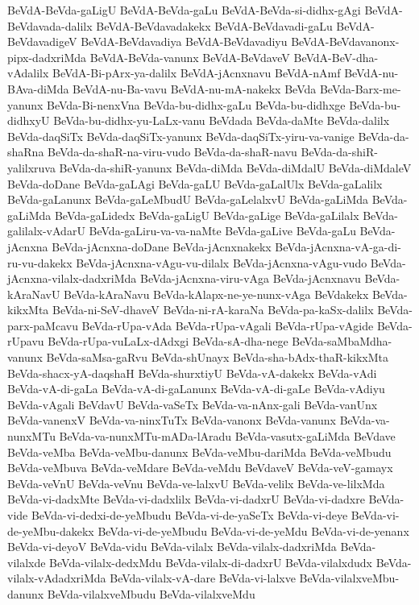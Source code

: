 {BeVdA-BeVda-gaLigU
BeVdA-BeVda-gaLu
BeVdA-BeVda-si-didhx-gAgi
BeVdA-BeVdavada-dalilx
BeVdA-BeVdavadakekx
BeVdA-BeVdavadi-gaLu
BeVdA-BeVdavadigeV
BeVdA-BeVdavadiya
BeVdA-BeVdavadiyu
BeVdA-BeVdavanonx-pipx-dadxriMda
BeVdA-BeVda-vanunx
BeVdA-BeVdaveV
BeVdA-BeV-dha-vAdalilx
BeVdA-Bi-pArx-ya-dalilx
BeVdA-jAcnxnavu
BeVdA-nAmf
BeVdA-nu-BAva-diMda
BeVdA-nu-Ba-vavu
BeVdA-nu-mA-nakekx
BeVda
BeVda-Barx-me-yanunx
BeVda-Bi-nenxVna
BeVda-bu-didhx-gaLu
BeVda-bu-didhxge
BeVda-bu-didhxyU
BeVda-bu-didhx-yu-LaLx-vanu
BeVdada
BeVda-daMte
BeVda-dalilx
BeVda-daqSiTx
BeVda-daqSiTx-yanunx
BeVda-daqSiTx-yiru-va-vanige
BeVda-da-shaRna
BeVda-da-shaR-na-viru-vudo
BeVda-da-shaR-navu
BeVda-da-shiR-yalilxruva
BeVda-da-shiR-yanunx
BeVda-diMda
BeVda-diMdalU
BeVda-diMdaleV
BeVda-doDane
BeVda-gaLAgi
BeVda-gaLU
BeVda-gaLalUlx
BeVda-gaLalilx
BeVda-gaLanunx
BeVda-gaLeMbudU
BeVda-gaLelalxvU
BeVda-gaLiMda
BeVda-gaLiMda
BeVda-gaLidedx
BeVda-gaLigU
BeVda-gaLige
BeVda-gaLilalx
BeVda-galilalx-vAdarU
BeVda-gaLiru-va-va-naMte
BeVda-gaLive
BeVda-gaLu
BeVda-jAcnxna
BeVda-jAcnxna-doDane
BeVda-jAcnxnakekx
BeVda-jAcnxna-vA-ga-di-ru-vu-dakekx
BeVda-jAcnxna-vAgu-vu-dilalx
BeVda-jAcnxna-vAgu-vudo
BeVda-jAcnxna-vilalx-dadxriMda
BeVda-jAcnxna-viru-vAga
BeVda-jAcnxnavu
BeVda-kAraNavU
BeVda-kAraNavu
BeVda-kAlapx-ne-ye-nunx-vAga
BeVdakekx
BeVda-kikxMta
BeVda-ni-SeV-dhaveV
BeVda-ni-rA-karaNa
BeVda-pa-kaSx-dalilx
BeVda-parx-paMcavu
BeVda-rUpa-vAda
BeVda-rUpa-vAgali
BeVda-rUpa-vAgide
BeVda-rUpavu
BeVda-rUpa-vuLaLx-dAdxgi
BeVda-sA-dha-nege
BeVda-saMbaMdha-vanunx
BeVda-saMsa-gaRvu
BeVda-shUnayx
BeVda-sha-bAdx-thaR-kikxMta
BeVda-shacx-yA-daqshaH
BeVda-shurxtiyU
BeVda-vA-dakekx
BeVda-vAdi
BeVda-vA-di-gaLa
BeVda-vA-di-gaLanunx
BeVda-vA-di-gaLe
BeVda-vAdiyu
BeVda-vAgali
BeVdavU
BeVda-vaSeTx
BeVda-va-nAnx-gali
BeVda-vanUnx
BeVda-vanenxV
BeVda-va-ninxTuTx
BeVda-vanonx
BeVda-vanunx
BeVda-va-nunxMTu
BeVda-va-nunxMTu-mADa-lAradu
BeVda-vasutx-gaLiMda
BeVdave
BeVda-veMba
BeVda-veMbu-danunx
BeVda-veMbu-dariMda
BeVda-veMbudu
BeVda-veMbuva
BeVda-veMdare
BeVda-veMdu
BeVdaveV
BeVda-veV-gamayx
BeVda-veVnU
BeVda-veVnu
BeVda-ve-lalxvU
BeVda-velilx
BeVda-ve-lilxMda
BeVda-vi-dadxMte
BeVda-vi-dadxlilx
BeVda-vi-dadxrU
BeVda-vi-dadxre
BeVda-vide
BeVda-vi-dedxi-de-yeMbudu
BeVda-vi-de-yaSeTx
BeVda-vi-deye
BeVda-vi-de-yeMbu-dakekx
BeVda-vi-de-yeMbudu
BeVda-vi-de-yeMdu
BeVda-vi-de-yenanx
BeVda-vi-deyoV
BeVda-vidu
BeVda-vilalx
BeVda-vilalx-dadxriMda
BeVda-vilalxde
BeVda-vilalx-dedxMdu
BeVda-vilalx-di-dadxrU
BeVda-vilalxdudx
BeVda-vilalx-vAdadxriMda
BeVda-vilalx-vA-dare
BeVda-vi-lalxve
BeVda-vilalxveMbu-danunx
BeVda-vilalxveMbudu
BeVda-vilalxveMdu
}
